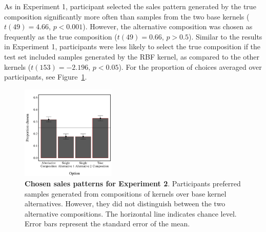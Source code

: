 \documentclass[10pt,letterpaper]{article}
\begin{document}
As in Experiment 1, participant selected the sales pattern generated by the true composition significantly more often than samples from the two base kernels ($t(49)=4.66$, $p<0.001$). However, the alternative composition was chosen as frequently as the true composition ($t(49)=0.66$, $p>0.5$). Similar to the results in Experiment 1, participants were less likely to select the true composition if the test set included samples generated by the RBF kernel, as compared to the other kernels ($t(153) = -2.196$, $p<0.05$). For the proportion of choices averaged over participants, see Figure~\ref{fig:results2}.
\begin{figure}[ht!]
\centering
\includegraphics[width=0.4\textwidth]{results2.pdf}
\caption{\textbf{Chosen sales patterns for Experiment 2}. Participants preferred samples generated from compositions of kernels over base kernel alternatives. However, they did not distinguish between the two alternative compositions. The horizontal line indicates chance level. Error bars represent the standard error of the mean.}
\label{fig:results2}
\end{figure}




\end{document}
